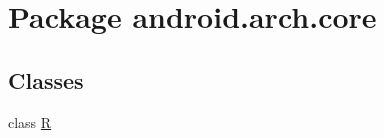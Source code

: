 \hypertarget{namespaceandroid_1_1arch_1_1core}{}\section{Package android.\+arch.\+core}
\label{namespaceandroid_1_1arch_1_1core}
\subsection*{Classes}
\begin{DoxyCompactItemize}
\item 
class \mbox{\hyperlink{classandroid_1_1arch_1_1core_1_1_r}{R}}
\end{DoxyCompactItemize}
